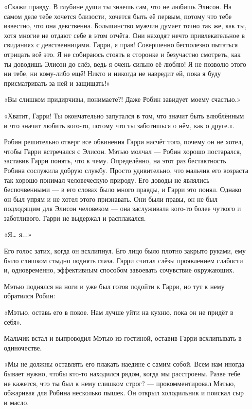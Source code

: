 \documentclass[a5paper, 9pt,
final, openany, twoside=true]{memoir}
\begin{document}
«Скажи правду. В глубине души ты знаешь сам, что не любишь Элисон. На самом деле тебе хочется близости, хочется быть её первым, потому что тебе известно, что она девственна. Большинство мужчин думает точно так же, как ты, хотя многие не отдают себе в этом отчёта. Они находят нечто привлекательное в свиданиях с девственницами. Гарри, я прав! Совершенно бесполезно пытаться отрицать всё это. Я не собираюсь стоять в сторонке и безучастно смотреть, как ты доводишь Элисон до слёз, ведь я очень сильно её люблю! Я не позволю этого ни тебе, ни кому-либо ещё! Никто и никогда не навредит ей, пока я буду присматривать за ней и защищать!»

«Вы слишком придирчивы, понимаете?! Даже Робин завидует моему счастью.»

«Хватит, Гарри! Ты окончательно запутался в том, что значит быть влюблённым и что значит любить кого-то, потому что ты заботишься о нём, как о друге.».

Робин решительно отверг все обвинения Гарри насчёт того, почему он не хотел, чтобы Гарри встречался с Элисон. Мэтью молчал — Робин хорошо постарался, заставив Гарри понять, что к чему. Определённо, на этот раз бестактность Робина сослужила добрую службу. Просто удивительно, что мальчик его возраста так хорошо понимал человеческую природу. Его доводы не являлись беспочвенными — в его словах было много правды, и Гарри это понял. Однако он был упрям и не хотел этого признавать. Они были правы, он не был подходящим для Элисон человеком — она заслуживала кого-то более чуткого и заботливого. Гарри не выдержал и расплакался.

«Я… я...»

Его голос затих, когда он всхлипнул. Его лицо было плотно закрыто руками, ему было слишком стыдно поднять глаза. Гарри считал слёзы проявлением слабости и, одновременно, эффективным способом завоевать сочувствие окружающих.

Мэтью поднялся на ноги и уже был готов подойти к Гарри, но тут к нему обратился Робин:

«Мэтью, оставь его в покое. Нам лучше уйти на кухню, пока он не придёт в себя».

Мальчик встал и выпроводил Мэтью из гостиной, оставив Гарри всхлипывать в одиночестве.

«Мы не должны оставлять его плакать наедине с самим собой. Всем нам иногда бывает нужно, чтобы кто-то находился рядом, когда мы расстроены. Разве тебе не кажется, что ты был к нему слишком строг? — прокомментировал Мэтью, обжаривая для Робина несколько пышек. Он открыл холодильник и поискал сыр и масло.
\end{document}
